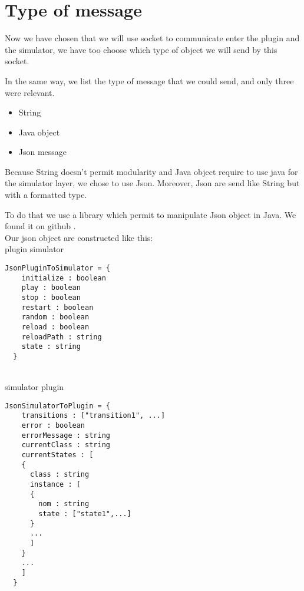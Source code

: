 

\section{Type of message}

Now we have chosen that we will use socket to communicate enter the plugin and the simulator, we have too choose which type of object we will send by this socket.

In the same way, we list the type of message that we could send, and only three were relevant.

\begin{itemize}
\item String
\item Java object
\item Json message
\end{itemize}

Because String doesn't permit modularity and Java object require to use java for the simulator layer, we chose to use Json. Moreover, Json are send like String but with a formatted type.

To do that we use a library which permit to manipulate Json object in Java. We found it on github \cite{json}.
~\\

Our json object are constructed like this:
~\\

plugin \overrightarrow{} simulator
\begin{lstlisting}[style=json]
  JsonPluginToSimulator = {
    initialize : boolean
    play : boolean
    stop : boolean
    restart : boolean
    random : boolean
    reload : boolean
    reloadPath : string
    state : string
  }
\end{lstlisting}

~\\

simulator \overrightarrow{} plugin
\begin{lstlisting}[style=json]
  JsonSimulatorToPlugin = {
    transitions : ["transition1", ...]
    error : boolean
    errorMessage : string
    currentClass : string
    currentStates : [
    {
      class : string
      instance : [
      {
        nom : string
        state : ["state1",...]
      }
      ...
      ]
    }
    ...
    ]
  }

\end{lstlisting}
